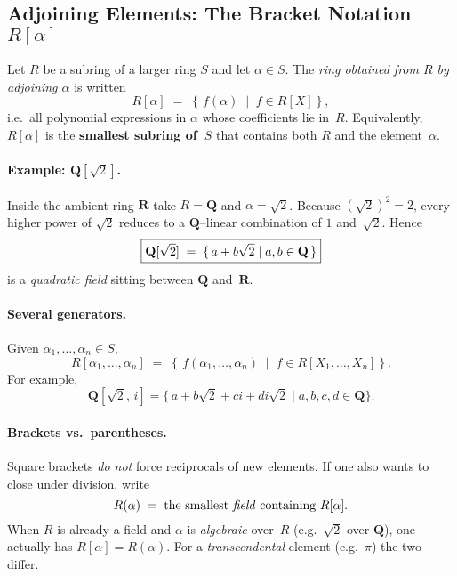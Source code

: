 \documentclass[12pt]{article}
\theoremstyle{definition} %
\theoremstyle{plain} %
\begin{document}
\subsection*{Adjoining Elements:  The Bracket Notation $R[\alpha]$}

Let $R$ be a subring of a larger ring $S$ and let $\alpha\in S$.  
The \emph{ring obtained from $R$ by adjoining $\alpha$} is written
\[
  R[\alpha]
  \;=\;
  \left\{\, f(\alpha)\;\middle|\; f\in R[X] \right\},
\]
i.e.\ all polynomial expressions in $\alpha$ whose coefficients lie in $R$.
Equivalently, $R[\alpha]$ is the \textbf{smallest subring of $S$} that contains
both $R$ and the element~$\alpha$.

\paragraph{Example: $\mathbf{Q}[\sqrt{2}]$.}
Inside the ambient ring $\mathbf{R}$ take $R=\mathbf{Q}$ and
$\alpha=\sqrt{2}$.  Because $(\sqrt{2})^{2}=2$, every higher power of
$\sqrt{2}$ reduces to a $\mathbf{Q}$–linear combination of $1$ and $\sqrt{2}$.
Hence
\[
  \boxed{%
    \mathbf{Q}[\sqrt{2}]
      \;=\;
      \{\,a+b\sqrt{2}\mid a,b\in\mathbf{Q}\,\}}
\]
is a \emph{quadratic field} sitting between $\mathbf{Q}$ and $\mathbf{R}$.

\paragraph{Several generators.}
Given $\alpha_{1},\dots,\alpha_{n}\in S$,
\[
  R[\alpha_{1},\dots,\alpha_{n}]
  \;=\;
  \left\{\, f(\alpha_{1},\dots,\alpha_{n})
           \;\middle|\;
           f\in R[X_{1},\dots,X_{n}] \right\}.
\]
For example,
\[
  \mathbf{Q}\!\left[\sqrt{2},\,i\right]
  =\bigl\{\,a+b\sqrt{2}+ci+di\sqrt{2}\mid a,b,c,d\in\mathbf{Q}\bigr\}.
\]

\paragraph{Brackets vs.\ parentheses.}
Square brackets \emph{do not} force reciprocals of new elements.  
If one also wants to close under division, write
\[
  R(\alpha)
  \;=\;
  \text{the smallest \emph{field} containing } R[\alpha].
\]
When $R$ is already a field and $\alpha$ is \emph{algebraic} over $R$
(e.g.\ $\sqrt{2}$ over $\mathbf{Q}$), one actually has $R[\alpha]=R(\alpha)$.
For a \emph{transcendental} element (e.g.\ $\pi$) the two differ.
\end{document}
